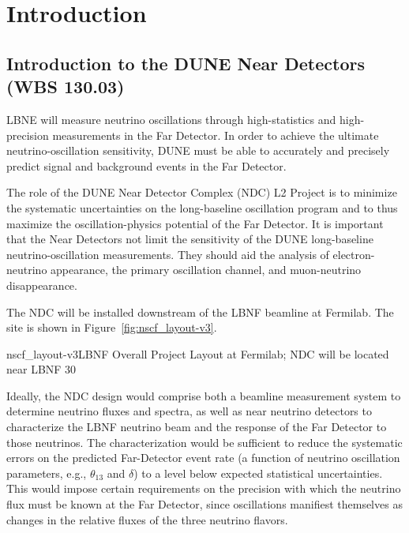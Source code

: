 \chapter{Introduction}  
\label{ch:intro}


%
\clearpage
\section{Introduction to the DUNE Near Detectors (WBS 130.03)}
\label{vol:intro}


LBNE will measure neutrino oscillations through high-statistics 
and high-precision measurements in the Far Detector. 
 In order to achieve the ultimate neutrino-oscillation sensitivity, DUNE must be able to accurately and 
precisely predict signal and background events in the Far Detector.

The role of the DUNE Near Detector Complex (NDC) L2 Project is to 
minimize the systematic uncertainties on 
the long-baseline oscillation program and to thus maximize the 
oscillation-physics potential of the Far Detector. It is important that the
 Near Detectors not limit the sensitivity of the 
DUNE long-baseline neutrino-oscillation measurements. 
They should aid the analysis of electron-neutrino 
appearance, the primary oscillation channel, and muon-neutrino disappearance. 

The NDC will be installed downstream of the LBNF beamline at Fermilab. The site is shown in Figure~\ref{fig:nscf_layout-v3}.

\begin{cdrfigure}{nscf_layout-v3}{LBNF Overall Project Layout at Fermilab; NDC will be located near LBNF 30}
\end{cdrfigure}

Ideally, the NDC design would comprise both a beamline measurement system to determine neutrino fluxes and spectra, as well as near neutrino detectors to characterize the LBNF neutrino beam and
the response of the Far Detector to those neutrinos.  The characterization would be sufficient to reduce the systematic errors
on the predicted Far-Detector event rate (a function of neutrino oscillation 
parameters, e.g., $\theta_{13}$ and $\delta$) to a level below expected statistical uncertainties.
This would impose certain requirements on
the precision with which the neutrino flux must be known at the Far Detector, since
oscillations manifiest themselves as changes in the relative fluxes of the three neutrino
flavors.

